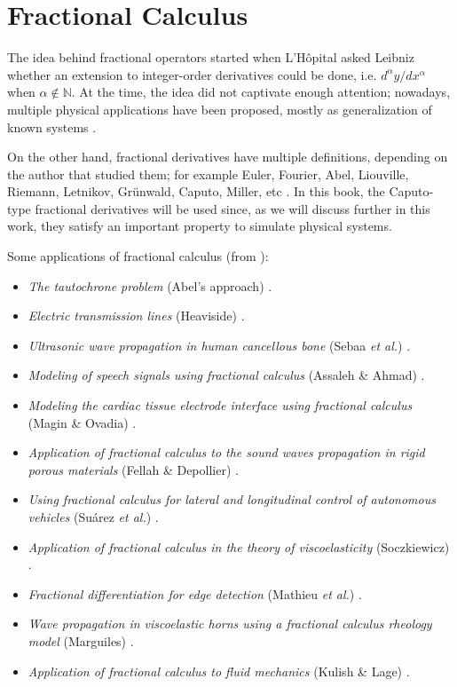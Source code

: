 \chapter{Fractional Calculus}

The idea behind fractional operators started when L'Hôpital asked Leibniz whether an extension to integer-order derivatives could be done, i.e. $d^\alpha y/dx^\alpha$ when $\alpha\notin\mathbb{N}$. At the time, the idea did not captivate enough attention; nowadays, multiple physical applications have been proposed, mostly as generalization of known systems \cite{deng2012numerical}. 

On the other hand, fractional derivatives have multiple definitions, depending on the author that studied them; for example Euler, Fourier, Abel, Liouville, Riemann, Letnikov, Grünwald, Caputo, Miller, etc \cite{dalir2010applications}. In this book, the Caputo-type fractional derivatives will be used since, as we will discuss further in this work, they satisfy an important property to simulate physical systems.

Some applications of fractional calculus (from \cite{dalir2010applications}):
\begin{multicols}{2}
\begin{itemize}
    \item \textit{The tautochrone problem} (Abel's approach) \cite{kisela2008fractional}.
    \item \textit{Electric transmission lines} (Heaviside) \cite{heaviside1899theory}.
    \item \textit{Ultrasonic wave propagation in human cancellous bone} (Sebaa \textit{et al.}) \cite{sebaa2006application}.
    \item \textit{Modeling of speech signals using fractional calculus} (Assaleh \& Ahmad) \cite{assaleh2007modeling}.
    \item \textit{Modeling the cardiac tissue electrode interface using fractional calculus} (Magin \& Ovadia) \cite{magin2006modeling}.
    \item \textit{Application of fractional calculus to the sound waves propagation in rigid porous materials} (Fellah \& Depollier) \cite{fellah2002application}.
    \item \textit{Using fractional calculus for lateral and longitudinal control of autonomous vehicles} (Su\'arez \textit{et al.}) \cite{suarez2003using}.
    \item \textit{Application of fractional calculus in the theory of viscoelasticity} (Soczkiewicz) \cite{soczkiewicz2002application}.
    \item \textit{Fractional differentiation for edge detection} (Mathieu \textit{et al.}) \cite{mathieu2003fractional}.
    \item \textit{Wave propagation in viscoelastic horns using a fractional calculus rheology model} (Marguiles) \cite{margulies2003wave}.
    \item \textit{Application of fractional calculus to fluid mechanics} (Kulish \& Lage) \cite{kulish2002application}.
\end{itemize}
\end{multicols}

